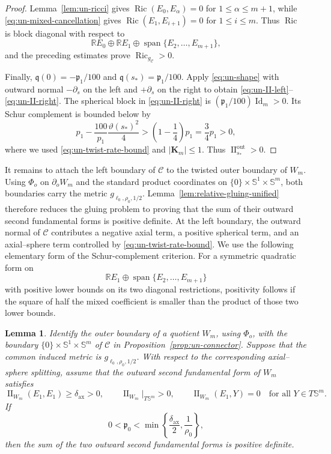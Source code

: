 \documentclass[11pt,reqno]{amsart}
\newtheorem{lemma}[theorem]{Lemma}
\theoremstyle{definition}
\numberwithin{equation}{section}
\DeclareMathOperator{\Ric}{Ric}
\DeclareMathOperator{\II}{II}
\begin{document}
\begin{proof}
Lemma~\ref{lem:un-ricci} gives
\(\Ric(E_0,E_\alpha)=0\) for \(1\le\alpha\le m+1\), while
\eqref{eq:un-mixed-cancellation} gives
\(\Ric(E_1,E_{i+1})=0\) for \(1\le i\le m\).  Thus \(\Ric\) is block
diagonal with respect to
\[
 \mathbb RE_0\oplus\mathbb RE_1
 \oplus\operatorname{span}\{E_2,\ldots,E_{m+1}\},
\]
and the preceding estimates prove \(\Ric_{g_{\mathcal C}}>0\).

Finally,
\(\mathfrak q(0)=-\mathfrak p_1/100\) and
\(\mathfrak q(s_*)=\mathfrak p_1/100\).  Apply
\eqref{eq:un-shape} with outward normal \(-\partial_s\) on the left and
\(+\partial_s\) on the right to obtain
\eqref{eq:un-II-left}--\eqref{eq:un-II-right}.  The spherical block in
\eqref{eq:un-II-right} is
\((\mathfrak p_1/100)\operatorname{Id}_m>0\).  Its Schur complement is
bounded below by
\[
 p_1-\frac{100}{p_1}\frac{\vartheta(s_*)^2}{4}
 >
 \left(1-\frac14\right)p_1
 =\frac34p_1>0,
\]
where we used \eqref{eq:un-twist-rate-bound} and
\(\lvert\mathbf K_m\rvert\le1\).  Thus
\(\II^{\mathrm{out}}_{s_*}>0\).
\end{proof}

It remains to attach the left boundary of $\mathcal C$ to the twisted
outer boundary of \(W_m\).  Using \(\Phi_o\) on \(\partial_oW_m\) and
the standard product coordinates on
\(\{0\}\times\mathbb S^1\times\mathbb S^m\), both boundaries carry the
metric \(g_{\ell_0,\rho_0,1/2}\).
Lemma~\ref{lem:relative-gluing-unified} therefore reduces the gluing
problem to proving that the sum of their outward second fundamental
forms is positive definite.  At the left boundary, the outward normal of $\mathcal C$
contributes a negative axial term, a positive spherical term, and an
axial--sphere term controlled by \eqref{eq:un-twist-rate-bound}.  We use
the following elementary form of the Schur-complement criterion.  For a
symmetric quadratic form on
\[
 \mathbb RE_1\oplus
 \operatorname{span}\{E_2,\ldots,E_{m+1}\}
\]
with positive lower bounds on its two diagonal restrictions, positivity
follows if the square of half the mixed coefficient is smaller than the
product of those two lower bounds.

\begin{lemma}
\label{lem:un-left-boundary-gluing}
Identify the outer boundary of a quotient \(W_m\), using \(\Phi_o\),
with the boundary
\(\{0\}\times\mathbb S^1\times\mathbb S^m\) of $\mathcal C$ in
Proposition~\ref{prop:un-connector}.  Suppose that the common induced
metric is \(g_{\ell_0,\rho_0,1/2}\).  With respect to the corresponding
axial--sphere splitting, assume that the outward second fundamental
form of \(W_m\) satisfies
\[
 \II_{W_m}(E_1,E_1)\ge\delta_{\mathrm{ax}}>0,\qquad
 \II_{W_m}|_{T\mathbb S^m}>0,\qquad
 \II_{W_m}(E_1,Y)=0
 \quad\text{for all }Y\in T\mathbb S^m.
\]
If
\[
 0<\mathfrak p_0<
 \min\left\{\frac{\delta_{\mathrm{ax}}}{2},
             \frac1{\rho_0}\right\},
\]
then the sum of the two outward second fundamental forms is positive
definite.
\end{lemma}
\end{document}
